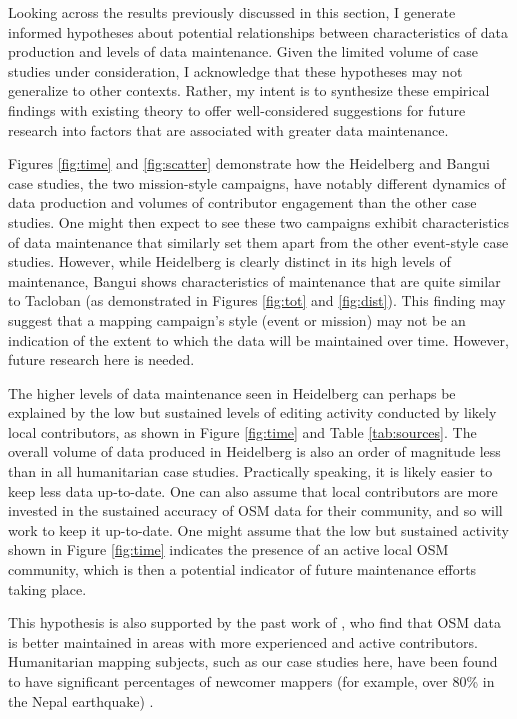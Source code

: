 Looking across the results previously discussed in this section, I generate informed hypotheses about potential relationships between characteristics of data production and levels of data maintenance. Given the limited volume of case studies under consideration, I acknowledge that these hypotheses may not generalize to other contexts. Rather, my intent is to synthesize these empirical findings with existing theory to offer well-considered suggestions for future research into factors that are associated with greater data maintenance. 

Figures \ref{fig:time} and \ref{fig:scatter} demonstrate how the Heidelberg and Bangui case studies, the two mission-style campaigns, have notably different dynamics of data production and volumes of contributor engagement than the other case studies. One might then expect to see these two campaigns exhibit characteristics of data maintenance that similarly set them apart from the other event-style case studies. However, while Heidelberg is clearly distinct in its high levels of maintenance, Bangui shows characteristics of maintenance that are quite similar to Tacloban (as demonstrated in Figures \ref{fig:tot} and \ref{fig:dist}). This finding may suggest that a mapping campaign’s style (event or mission) may not be an indication of the extent to which the data will be maintained over time. However, future research here is needed. 

The higher levels of data maintenance seen in Heidelberg can perhaps be explained by the low but sustained levels of editing activity conducted by likely local contributors, as shown in Figure \ref{fig:time} and Table \ref{tab:sources}. The overall volume of data produced in Heidelberg is also an order of magnitude less than in all humanitarian case studies. Practically speaking, it is likely easier to keep less data up-to-date. One can also assume that local contributors are more invested in the sustained accuracy of OSM data for their community, and so will work to keep it up-to-date. One might assume that the low but sustained activity shown in Figure \ref{fig:time} indicates the presence of an active local OSM community, which is then a potential indicator of future maintenance efforts taking place. 

This hypothesis is also supported by the past work of  \textcite{quattrone_work_2017}, who find that OSM data is better maintained in areas with more experienced and active contributors. Humanitarian mapping subjects, such as our case studies here, have been found to have significant percentages of newcomer mappers (for example, over 80\% in the Nepal earthquake) \parencite{dittus_mass_2017}. 

